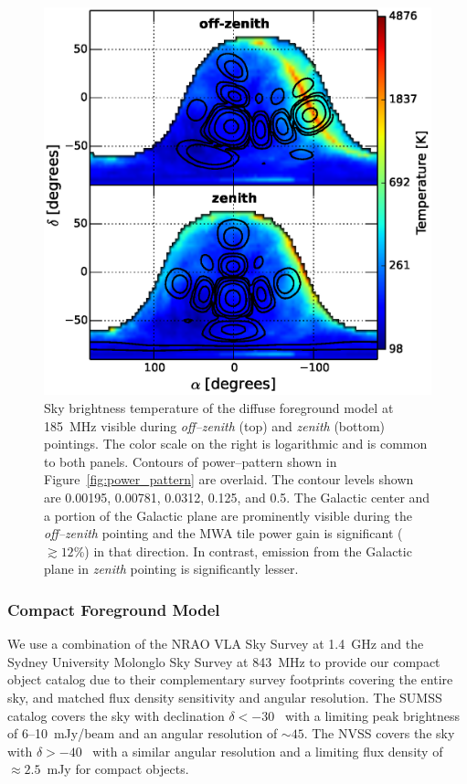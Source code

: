 \documentclass[preprint2,iop,numberedappendix]{emulateapj}
\begin{document}
\begin{figure}[htb]
\centering
\includegraphics[width=\linewidth]{figures/v1_0/dsm.eps}
\caption{Sky brightness temperature of the diffuse foreground model at 185~MHz visible during {\it off--zenith} (top) and {\it zenith} (bottom) pointings. The color scale on the right is logarithmic and is common to both panels. Contours of power--pattern shown in Figure~\ref{fig:power_pattern} are overlaid. The contour levels shown are 0.00195, 0.00781, 0.0312, 0.125, and 0.5. The Galactic center and a portion of the Galactic plane are prominently visible during the {\it off--zenith} pointing and the MWA tile power gain is significant ($\gtrsim 12$\%) in that direction. In contrast, emission from the Galactic plane in {\it zenith} pointing is significantly lesser. \label{fig:DSM}}
\end{figure}

\subsubsection{Compact Foreground Model}\label{sec:CSM}

We use a combination of the NRAO VLA Sky Survey \citep[NVSS;][]{con98} at 1.4~GHz and the Sydney University Molonglo Sky Survey \citep[SUMSS;][]{boc99,mau03} at 843~MHz to provide our compact object catalog due to their complementary survey footprints covering the entire sky, and matched flux density sensitivity and angular resolution. The SUMSS catalog covers the sky with declination $\delta < -30$\arcdeg~ with a limiting peak brightness of 6--10~mJy/beam and an angular resolution of $\sim 45$\arcsec. The NVSS covers the sky with $\delta > -40$\arcdeg~ with a similar angular resolution and a limiting flux density of $\approx 2.5$~mJy for compact objects. 
\end{document}
